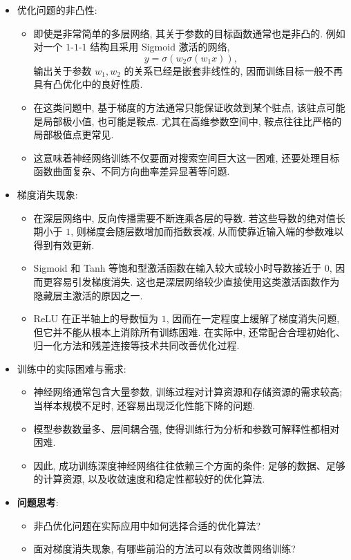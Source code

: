 \documentclass{../nndlcourse}
\begin{document}
\begin{itemize}
    \item 优化问题的非凸性:
    \begin{itemize}
        \item 即使是非常简单的多层网络, 其关于参数的目标函数通常也是非凸的. 例如对一个 $1$-$1$-$1$ 结构且采用 Sigmoid 激活的网络,
        \begin{equation*}
            y = \sigma\left(w_2\sigma\left(w_1x\right)\right),
        \end{equation*}
        输出关于参数 $w_1, w_2$ 的关系已经是嵌套非线性的, 因而训练目标一般不再具有凸优化中的良好性质. 
        \item 在这类问题中, 基于梯度的方法通常只能保证收敛到某个驻点, 该驻点可能是局部极小值, 也可能是鞍点. 尤其在高维参数空间中, 鞍点往往比严格的局部极值点更常见. 
        \item 这意味着神经网络训练不仅要面对搜索空间巨大这一困难, 还要处理目标函数曲面复杂、不同方向曲率差异显著等问题. 
    \end{itemize}
    \item 梯度消失现象:
    \begin{itemize}
        \item 在深层网络中, 反向传播需要不断连乘各层的导数. 若这些导数的绝对值长期小于 $1$, 则梯度会随层数增加而指数衰减, 从而使靠近输入端的参数难以得到有效更新. 
        \item Sigmoid 和 Tanh 等饱和型激活函数在输入较大或较小时导数接近于 $0$, 因而更容易引发梯度消失. 这也是深层网络较少直接使用这类激活函数作为隐藏层主激活的原因之一. 
        \item ReLU 在正半轴上的导数恒为 $1$, 因而在一定程度上缓解了梯度消失问题, 但它并不能从根本上消除所有训练困难. 在实际中, 还常配合合理初始化、归一化方法和残差连接等技术共同改善优化过程. 
    \end{itemize}
    \item 训练中的实际困难与需求:
    \begin{itemize}
        \item 神经网络通常包含大量参数, 训练过程对计算资源和存储资源的需求较高; 当样本规模不足时, 还容易出现泛化性能下降的问题. 
        \item 模型参数数量多、层间耦合强, 使得训练行为分析和参数可解释性都相对困难. 
        \item 因此, 成功训练深度神经网络往往依赖三个方面的条件: 足够的数据、足够的计算资源, 以及收敛速度和稳定性都较好的优化算法. 
    \end{itemize}
    \item \textbf{问题思考}: 
    \begin{itemize}
        \item 非凸优化问题在实际应用中如何选择合适的优化算法? 
        \item 面对梯度消失现象, 有哪些前沿的方法可以有效改善网络训练? 
    \end{itemize}
\end{itemize}
\end{document}
